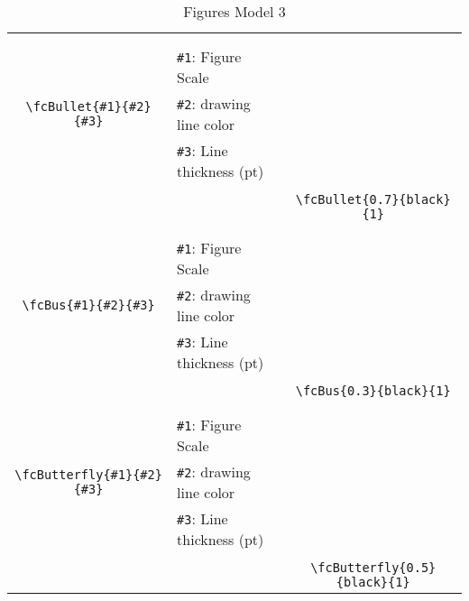 \documentclass[x11names]{article}
\begin{document}
\begin{table}[H]
\begin{tabular}{|c|l|c|}
	&&\multirow{5}{*}{\fcBullet{0.7}{black}{1}}\\	&&\\	&\verb|#1|: Figure Scale &\\	\verb|\fcBullet{#1}{#2}{#3}|&	\verb|#2|: drawing line color &\\	&\verb|#3|: Line thickness (pt) &\\ &&\\&&	\verb|\fcBullet{0.7}{black}{1}|\\\hline 	
	&&\multirow{5}{*}{\fcBus{0.3}{black}{1}}\\	&&\\	&\verb|#1|: Figure Scale &\\	\verb|\fcBus{#1}{#2}{#3}|&	\verb|#2|: drawing line color &\\	&\verb|#3|: Line thickness (pt) &\\ &&\\&&	\verb|\fcBus{0.3}{black}{1}|\\\hline 	
	&&\multirow{5}{*}{\fcButterfly{0.5}{black}{1}}\\	&&\\	&\verb|#1|: Figure Scale &\\	\verb|\fcButterfly{#1}{#2}{#3}|&	\verb|#2|: drawing line color &\\	&\verb|#3|: Line thickness (pt) &\\ &&\\&&	\verb|\fcButterfly{0.5}{black}{1}|\\\hline 	\hline\end{tabular}\caption{Figures Model 3}\label{tab3}\end{table}
\end{document}

